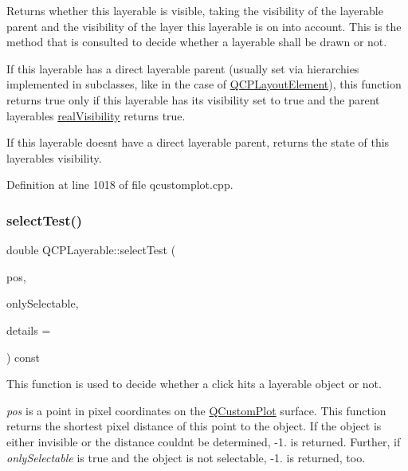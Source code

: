 Returns whether this layerable is visible, taking the visibility of the layerable parent and the visibility of the layer this layerable is on into account. This is the method that is consulted to decide whether a layerable shall be drawn or not.

If this layerable has a direct layerable parent (usually set via hierarchies implemented in subclasses, like in the case of \hyperlink{class_q_c_p_layout_element}{Q\+C\+P\+Layout\+Element}), this function returns true only if this layerable has its visibility set to true and the parent layerable\textquotesingle{}s \hyperlink{class_q_c_p_layerable_ab054e88f15d485defcb95e7376f119e7}{real\+Visibility} returns true.

If this layerable doesn\textquotesingle{}t have a direct layerable parent, returns the state of this layerable\textquotesingle{}s visibility. 

Definition at line 1018 of file qcustomplot.\+cpp.

\mbox{\label{class_q_c_p_layerable_a04db8351fefd44cfdb77958e75c6288e}} 
\subsubsection{\texorpdfstring{select\+Test()}{selectTest()}}
{\footnotesize\ttfamily double Q\+C\+P\+Layerable\+::select\+Test (\begin{DoxyParamCaption}\item[{const Q\+PointF \&}]{pos,  }\item[{bool}]{only\+Selectable,  }\item[{Q\+Variant $\ast$}]{details = {} }\end{DoxyParamCaption}) const\hspace{0.3cm}{\ttfamily [virtual]}}

This function is used to decide whether a click hits a layerable object or not.

{\itshape pos} is a point in pixel coordinates on the \hyperlink{class_q_custom_plot}{Q\+Custom\+Plot} surface. This function returns the shortest pixel distance of this point to the object. If the object is either invisible or the distance couldn\textquotesingle{}t be determined, -\/1. is returned. Further, if {\itshape only\+Selectable} is true and the object is not selectable, -\/1. is returned, too.

